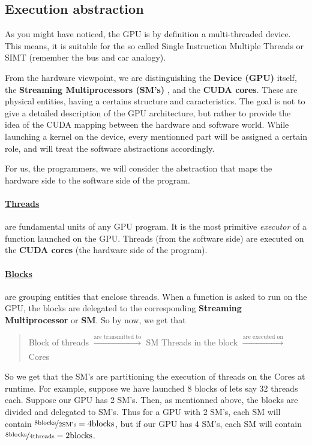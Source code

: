 \documentclass[12pt]{article}
\begin{document}
\subsection{Execution abstraction}
As you might have noticed, the GPU is by definition a multi-threaded device. This means, it is suitable for the so called 
Single Instruction Multiple Threads or SIMT (remember the bus and car analogy).


From the hardware viewpoint, we are distinguishing the \textbf{Device (GPU)} itself, the \textbf{Streaming Multiprocessors (SM's)}
, and the \textbf{CUDA cores}. These are physical entities, having a certains structure and caracteristics. 
The goal is not to give a detailed description of the GPU architecture, but rather to provide the 
idea of the CUDA mapping between the hardware and software world. While launching a kernel on the device, 
every mentionned part will be assigned a certain role, and will treat the software abstractions accordingly.

For us, the programmers, we will consider the abstraction that maps the hardware side to the software side of the program. 

\vspace{-15pt}
\paragraph{\underline{Threads}} are fundamental units of any GPU program. It is the most primitive \textit{executor} of a function 
launched on the GPU. Threads (from the software side) are executed on the \textbf{CUDA cores} (the hardware side of the program).

\vspace{-15pt}
\paragraph{\underline{Blocks}} \label{blocks} are grouping entities that enclose threads. When a function is asked to run on the GPU, the 
blocks are delegated to the corresponding \textbf{Streaming Multiprocessor} or \textbf{SM}.
So by now, we get that 

\begin{quote}
   \centering
   Block of threads $\xrightarrow[]{\text{are transmitted to}}$ SM \newline
   Threads in the block $\xrightarrow[]{\text{are executed on}}$ Cores 
\end{quote} 

So we get that the SM's are partitioning the execution of threads on the Cores at runtime. For example, suppose we have 
launched 8 blocks of lets say 32 threads each. Suppose our GPU has 2 SM's. Then, as mentionned above, 
the blocks are divided and delegated to SM's. Thus for a GPU with 2 SM's, each SM will contain 
$\nicefrac{8\text{blocks}}{2\text{SM's}} = 4 \text{blocks}$, but if our GPU has 4 SM's, 
each SM will contain $\nicefrac{8\text{blocks}}{4\text{threads}} = 2 \text{blocks}$.
\end{document}
